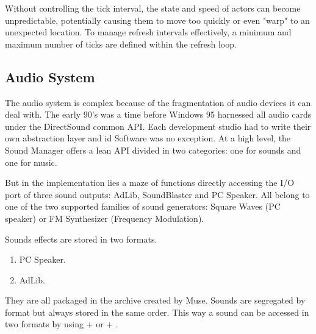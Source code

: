 \documentclass[book.tex]{subfiles}
\begin{document}
\par
Without controlling the tick interval, the state and speed of actors can become unpredictable, potentially causing them to move too quickly or even "warp" to an unexpected location. To manage refresh intervals effectively, a minimum and maximum number of ticks are defined within the refresh loop.\\

\par
\begin{minipage}{\textwidth}
  
\end{minipage}
\label{time_ticks}


\pagebreak
\subsection{Audio System}
The audio system is complex because of the fragmentation of audio devices it can deal with. The early 90's was a time before Windows 95 harnessed all audio cards under the DirectSound common API. Each development studio had to write their own abstraction layer and id Software was no exception. At a high level, the Sound Manager offers a lean API divided in two categories: one for sounds and one for music.\\

\par
\begin{minipage}{\textwidth}

\end{minipage}
\par
\vspace{10pt}

But in the implementation lies a maze of functions directly accessing the I/O port of three sound outputs: AdLib, SoundBlaster and PC Speaker. All belong to one of the two supported families of sound generators: Square Waves (PC speaker) or FM Synthesizer (Frequency Modulation). \\

\par
Sounds effects are stored in two formats.
\begin{enumerate}
\item PC Speaker.
\item AdLib.
\end{enumerate}

They are all packaged in the  archive created by Muse. Sounds are segregated by format but always stored in the same order. This way a sound can be accessed in two formats by using  +  or  + .\\
\end{document}
